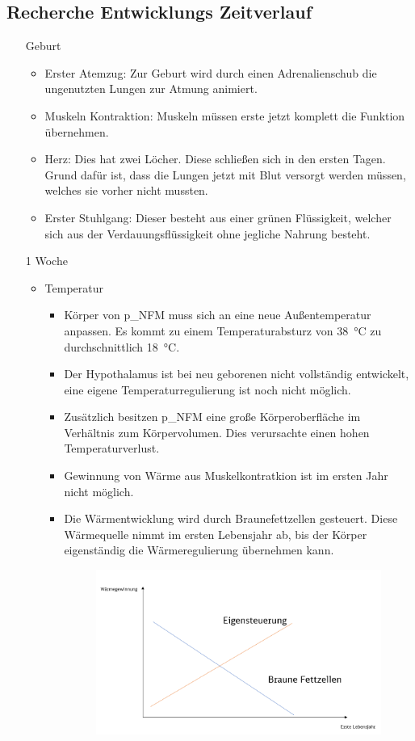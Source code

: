 \subsection{Recherche Entwicklungs Zeitverlauf}
\begin{enumerate}%
	\item[Geburt]
	\begin{itemize}
		\item Erster Atemzug: Zur Geburt wird durch einen Adrenalienschub die ungenutzten Lungen zur Atmung animiert.
		\item Muskeln Kontraktion: Muskeln müssen erste jetzt komplett die Funktion übernehmen.
		\item Herz: Dies hat zwei Löcher. Diese schließen sich in den ersten Tagen. Grund dafür ist, dass die Lungen jetzt mit Blut versorgt werden müssen, welches sie vorher nicht mussten.
		\item Erster Stuhlgang: Dieser besteht aus einer grünen Flüssigkeit, welcher sich aus der Verdauungsflüssigkeit ohne jegliche Nahrung besteht.
	\end{itemize}
	\item[1 Woche]
	\begin{itemize}
		\item Temperatur
		\begin{itemize}
			\item Körper von \gls{p_NFM} muss sich an eine neue Außentemperatur anpassen. Es kommt zu einem Temperaturabsturz von \SI{38}{\celsius} zu durchschnittlich \SI{18}{\celsius}.
			\item Der Hypothalamus ist bei neu geborenen nicht vollständig entwickelt, eine eigene Temperaturregulierung ist noch nicht möglich.
			\item Zusätzlich besitzen \gls{p_NFM} eine große Körperoberfläche im Verhältnis zum Körpervolumen. Dies verursachte einen hohen Temperaturverlust. 
			\item Gewinnung von Wärme aus Muskelkontratkion ist im ersten Jahr nicht möglich.
			\item Die Wärmentwicklung wird durch Braunefettzellen gesteuert. Diese Wärmequelle nimmt im ersten Lebensjahr ab, bis der Körper eigenständig die Wärmeregulierung übernehmen kann.
			\begin{figure}[H]
				\centering
				\includegraphics[scale = 0.3]{attachment/chapter_9/Scc001}

\end{figure}
\end{itemize}
\end{itemize}
\end{enumerate}
